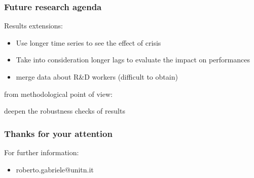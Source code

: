 \documentclass[10pt,handout,xcolor=pdftex,dvipsnames,table]{beamer}
\begin{document}
\begin{frame}
\frametitle{Future research agenda}
\begin{block}{Results extensions:}
\begin{itemize}
\item Use longer time series to see the effect of crisis
\item Take into consideration longer lags to evaluate the impact on performances 
\item merge data about R\&D workers (difficult to obtain)
\end{itemize}
\end{block}
from methodological point of view:

deepen the robustness checks of results
\end{frame}

\begin{frame}
	\frametitle{Thanks for your attention}





\begin{block}{For further information:}

\begin{itemize}
			\item roberto.gabriele@unitn.it 
\end{itemize}

\end{block}
\end{frame}
\end{document}
